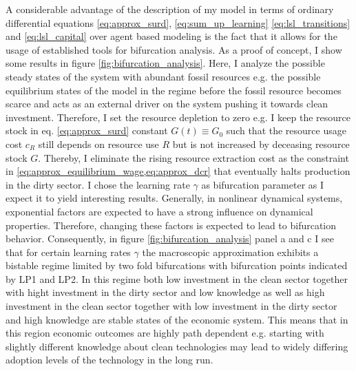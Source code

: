 A considerable advantage of the description of my model in terms of ordinary differential equations \eqref{eq:approx_surd}, \eqref{eq:sum_up_learning} \eqref{eq:lsl_transitions} and \eqref{eq:lsl_capital} over agent based modeling is the fact that it allows for the usage of established tools for bifurcation analysis.
As a proof of concept, I show some results in figure \ref{fig:bifurcation_analysis}.
Here, I analyze the possible steady states of the system with abundant fossil resources e.g. the possible equilibrium states of the model in the regime before the fossil resource becomes scarce and acts as an external driver on the system pushing it towards clean investment.
Therefore, I set the resource depletion to zero e.g. I keep the resource stock in eq. \eqref{eq:approx_surd} constant $G(t) \equiv G_0$ such that the resource usage cost $c_R$ still depends on resource use $R$ but is not increased by deceasing resource stock $G$. Thereby, I eliminate the rising resource extraction cost as the constraint in \cref{eq:approx_equilibrium_wage,eq:approx_dcr} that eventually halts production in the dirty sector. 
I chose the learning rate $\gamma$ as bifurcation parameter as I expect it to yield interesting results.
Generally, in nonlinear dynamical systems, exponential factors are expected to have a strong influence on dynamical properties. Therefore, changing these factors is expected to lead to bifurcation behavior.
Consequently, in figure \ref{fig:bifurcation_analysis} panel a and c I see that for certain learning rates $\gamma$ the macroscopic approximation exhibits a bistable regime limited by two fold bifurcations with bifurcation points indicated by LP1 and LP2.
In this regime both low investment in the clean sector together with hight investment in the dirty sector and low knowledge as well as high investment in the clean sector together with low investment in the dirty sector and high knowledge are stable states of the economic system. This means that in this region economic outcomes are highly path dependent e.g. starting with slightly different knowledge about clean technologies may lead to widely differing adoption levels of the technology in the long run.

